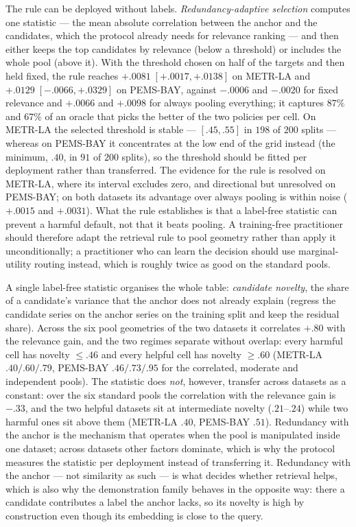 The rule can be deployed without labels. \emph{Redundancy-adaptive selection}
computes one statistic --- the mean absolute correlation between the anchor and
the candidates, which the protocol already needs for relevance ranking --- and
then either keeps the top candidates by relevance (below a threshold) or
includes the whole pool (above it). With the threshold chosen on half of the
targets and then held fixed, the rule reaches $+.0081\;[+.0017,+.0138]$ on
METR-LA and $+.0129\;[-.0066,+.0329]$ on PEMS-BAY, against $-.0006$ and
$-.0020$ for fixed relevance and $+.0066$ and $+.0098$ for always pooling
everything; it captures $87\%$ and $67\%$ of an oracle that picks the better of
the two policies per cell. On METR-LA the selected threshold is stable ---
$[.45,.55]$ in $198$ of $200$ splits --- whereas on PEMS-BAY it concentrates at
the low end of the grid instead (the minimum, $.40$, in $91$ of $200$ splits),
so the threshold should be fitted per deployment rather than transferred. The evidence for the rule is resolved on METR-LA, where
its interval excludes zero, and directional but unresolved on PEMS-BAY; on both
datasets its advantage over always pooling is within noise ($+.0015$ and
$+.0031$). What the rule establishes is that a label-free statistic can prevent
a harmful default, not that it beats pooling. A training-free practitioner
should therefore adapt the
retrieval rule to pool geometry rather than apply it unconditionally; a
practitioner who can learn the decision should use marginal-utility routing
instead, which is roughly twice as good on the standard pools.

A single label-free statistic organises the whole table: \emph{candidate
novelty}, the share of a candidate's variance that the anchor does not already
explain (regress the candidate series on the anchor series on the training
split and keep the residual share). Across the six pool geometries of the two
datasets it correlates $+.80$ with the relevance gain, and the two regimes
separate without overlap: every harmful cell has novelty $\le .46$ and every
helpful cell has novelty $\ge .60$ (METR-LA $.40/.60/.79$, PEMS-BAY
$.46/.73/.95$ for the correlated, moderate and independent pools). The statistic does \emph{not}, however, transfer
across datasets as a constant: over the six standard pools the correlation with
the relevance gain is $-.33$, and the two helpful datasets sit at intermediate
novelty ($.21$--$.24$) while two harmful ones sit above them (METR-LA $.40$,
PEMS-BAY $.51$). Redundancy with the anchor is the mechanism that operates when
the pool is manipulated inside one dataset; across datasets other factors
dominate, which is why the protocol measures the statistic per deployment
instead of transferring it. Redundancy
with the anchor --- not similarity as such --- is what decides whether retrieval
helps, which is also why the demonstration family behaves in the opposite way:
there a candidate contributes a label the anchor lacks, so its novelty is high
by construction even though its embedding is close to the query.

